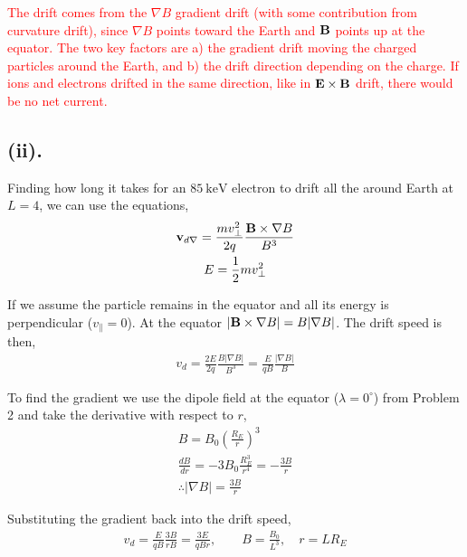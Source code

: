 \documentclass[11pt]{article}
\begin{document}
\hspace*{2em}\textcolor{red}{The drift comes from the $\nabla B$ gradient drift (with some contribution from curvature drift), since $\nabla B$
points toward the Earth and $\bold{B}$ points up at the equator. The two key factors are a) the gradient drift moving the charged
particles around the Earth, and b) the drift direction depending on the charge. If ions and electrons drifted in the same direction,
like in $\bold{E}\times\bold{B}$ drift, there would be no net current.}

\subsection*{(ii).}
\hspace*{2em}Finding how long it takes for an $85~\mathrm{keV}$ electron to drift all the around Earth at $L=4$, we can use the equations, 
\begin{gather*}
\bold{v}_{d\nabla} = \frac{mv_{\perp}^2}{2q} \frac{\bold{B}\times \nabla B}{B^3} \\
E = \frac{1}{2}m v_{\perp}^2
\end{gather*}

\hspace*{2em}If we assume the particle remains in the equator and all its energy is perpendicular ($v_{\parallel} = 0$). At the equator $|\bold{B}\times\nabla B| = B|\nabla B|$. The drift speed is then,
\begin{gather*}
v_d = \frac{2E}{2q}\frac{B|\nabla B|}{B^3} = \frac{E}{qB}\frac{|\nabla B|}{B}
\end{gather*}

\hspace*{2em}To find the gradient we use the dipole field at the equator ($\lambda = 0^\circ$) from Problem 2 and take the derivative with respect to $r$,
\begin{gather*}
B = B_0\left(\frac{R_E}{r}\right)^3 \\
\frac{dB}{dr} = -3B_0\frac{R_E^3}{r^4} = -\frac{3B}{r} \\
\therefore |\nabla B| = \frac{3B}{r}
\end{gather*}

\hspace*{2em}Substituting the gradient back into the drift speed,
\begin{gather*}
v_d = \frac{E}{qB}\frac{3B}{rB} = \frac{3E}{qBr}, \qquad B=\frac{B_0}{L^3}, \quad r = LR_E
\end{gather*}
\end{document}
